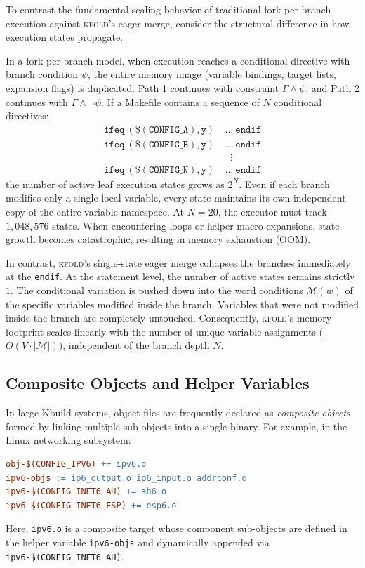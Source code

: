 \documentclass[acmsmall,screen,review]{acmart}
\newcommand{\tool}{\textsc{kfold}\xspace}
\begin{document}
To contrast the fundamental scaling behavior of traditional fork-per-branch execution against \tool's eager merge, consider the structural difference in how execution states propagate.

In a fork-per-branch model, when execution reaches a conditional directive with branch condition $\psi$, the entire memory image (variable bindings, target lists, expansion flags) is duplicated. Path 1 continues with constraint $\Gamma \wedge \psi$, and Path 2 continues with $\Gamma \wedge \neg \psi$. If a Makefile contains a sequence of $N$ conditional directives:
\begin{align*}
\mathtt{ifeq\ (\$(CONFIG\_A),y)}\ & \dots\ \mathtt{endif} \\
\mathtt{ifeq\ (\$(CONFIG\_B),y)}\ & \dots\ \mathtt{endif} \\
&\;\;\vdots \\
\mathtt{ifeq\ (\$(CONFIG\_N),y)}\ & \dots\ \mathtt{endif}
\end{align*}
the number of active leaf execution states grows as $2^N$. Even if each branch modifies only a single local variable, every state maintains its own independent copy of the entire variable namespace. At $N=20$, the executor must track $1{,}048{,}576$ states. When encountering loops or helper macro expansions, state growth becomes catastrophic, resulting in memory exhaustion (OOM).

In contrast, \tool's single-state eager merge collapses the branches immediately at the \texttt{endif}. At the statement level, the number of active states remains strictly $1$. The conditional variation is pushed down into the word conditions $\mathcal{M}(w)$ of the specific variables modified inside the branch. Variables that were not modified inside the branch are completely untouched. Consequently, \tool's memory footprint scales linearly with the number of unique variable assignments ($O(V \cdot |\mathcal{M}|)$), independent of the branch depth $N$.

\subsection{Composite Objects and Helper Variables}
\label{sec:overview:composite}

In large Kbuild systems, object files are frequently declared as \emph{composite objects} formed by linking multiple sub-objects into a single binary. For example, in the Linux networking subsystem:
\begin{lstlisting}[language=make]
obj-$(CONFIG_IPV6) += ipv6.o
ipv6-objs := ip6_output.o ip6_input.o addrconf.o
ipv6-$(CONFIG_INET6_AH) += ah6.o
ipv6-$(CONFIG_INET6_ESP) += esp6.o
\end{lstlisting}
Here, \texttt{ipv6.o} is a composite target whose component sub-objects are defined in the helper variable \texttt{ipv6-objs} and dynamically appended via \texttt{ipv6-\$(CONFIG\_INET6\_AH)}. 
\end{document}

